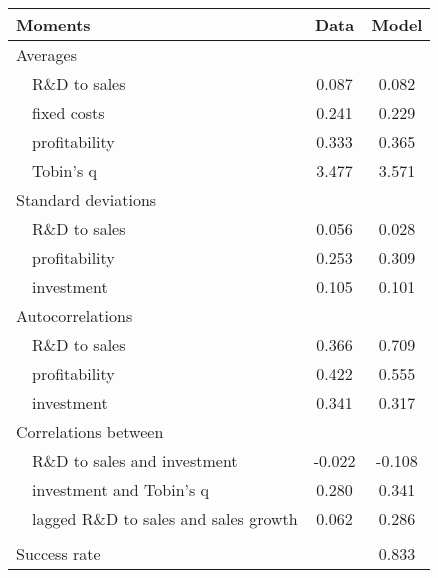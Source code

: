 
    \begin{tabular}{p{.3cm}lcc} \\ 
        \hline 
        \multicolumn{2}{l}{Moments} & Data & Model \\ 
        \hline 
        \multicolumn{4}{l}{Averages} \\ 
        &R\&D to sales & 0.087 & 0.082 \\ 
        &fixed costs & 0.241 & 0.229 \\ 
        &profitability & 0.333 & 0.365 \\ 
        &Tobin's q & 3.477 & 3.571 \\ 
        \multicolumn{4}{l}{Standard deviations} \\ 
        &R\&D to sales & 0.056 & 0.028 \\ 
        &profitability & 0.253 & 0.309 \\ 
        &investment & 0.105 & 0.101 \\ 
        \multicolumn{4}{l}{Autocorrelations} \\ 
        &R\&D to sales & 0.366 & 0.709 \\ 
        &profitability & 0.422 & 0.555 \\ 
        &investment & 0.341 & 0.317 \\ 
        \multicolumn{4}{l}{Correlations between} \\ 
        &R\&D to sales and investment & -0.022 & -0.108 \\ 
        &investment and Tobin's q & 0.280 & 0.341 \\ 
        &lagged R\&D to sales and sales growth & 0.062 & 0.286 \\ 
        \\ 
        \multicolumn{3}{l}{Success rate}& 0.833 \\ 
        \hline 
    \end{tabular} 
